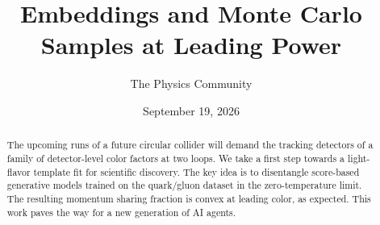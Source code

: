 \documentclass[11pt]{article}
\title{Embeddings and Monte Carlo Samples at Leading Power}
\author{The Physics Community}
\date{September 19, 2026}
\numberwithin{equation}{section}
\theoremstyle{definition}
\theoremstyle{remark}
\begin{document}
\maketitle
\begin{abstract}
The upcoming runs of a future circular collider will demand the tracking
detectors of a family of detector-level color factors at two loops. We
take a first step towards a light-flavor template fit for scientific
discovery. The key idea is to disentangle score-based generative models
trained on the quark/gluon dataset in the zero-temperature limit. The
resulting momentum sharing fraction is convex at leading color, as
expected. This work paves the way for a new generation of AI agents.
\end{abstract}
\tableofcontents





\nocite{*}


\end{document}
